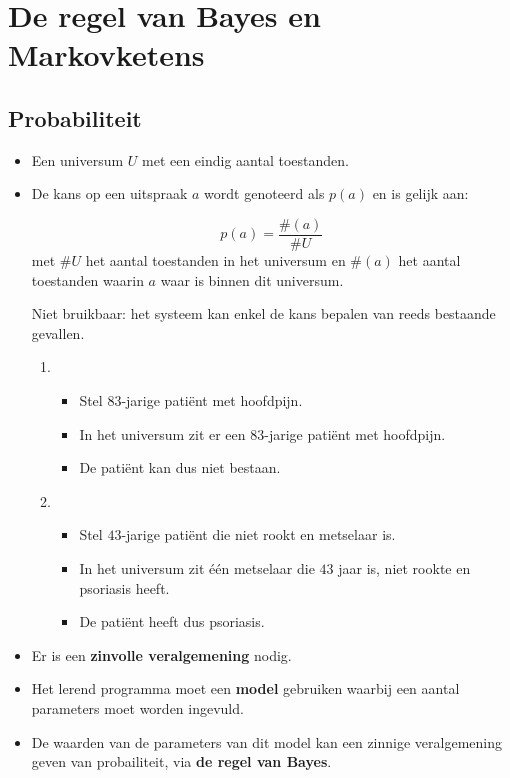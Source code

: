 \chapter{De regel van Bayes en Markovketens}


\section{Probabiliteit}
\begin{itemize}
	\item Een universum $U$ met een eindig aantal toestanden.
	\item De kans op een uitspraak $a$ wordt genoteerd als $p(a)$ en is gelijk aan:
	
	$$p(a) = \frac{\#(a)}{\#U} $$
	met $\#U$ het aantal toestanden in het universum en $\#(a)$ het aantal toestanden waarin $a$ waar is binnen dit universum.
	\begin{itemize}
		\alert Niet bruikbaar: het systeem kan enkel de kans bepalen van reeds bestaande gevallen. 
		\begin{enumerate}
			\item \begin{itemize}
				\item Stel $83$-jarige patiënt met hoofdpijn.
				\item In het universum zit er een $83$-jarige patiënt met hoofdpijn.
				\item De patiënt kan dus niet bestaan.
			\end{itemize}
			\item \begin{itemize}
				\item Stel $43$-jarige patiënt die niet rookt en metselaar is.
				\item In het universum zit één metselaar die $43$ jaar is, niet rookte en psoriasis heeft. 
				\item De patiënt heeft dus psoriasis.
			\end{itemize}
		\end{enumerate}
		
	\end{itemize}
	\item Er is een \textbf{zinvolle veralgemening} nodig.
	\item Het lerend programma moet een \textbf{model} gebruiken waarbij een aantal parameters moet worden ingevuld. 
	\item De waarden van de parameters van dit model kan een zinnige veralgemening geven van probailiteit, via \textbf{de regel van Bayes}.
		
\end{itemize}


